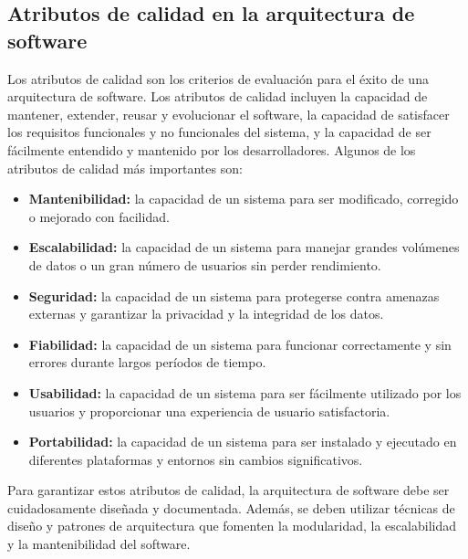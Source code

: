 \documentclass[executivepaper]{article}
\begin{document}
\subsection{Atributos de calidad en la arquitectura de software}

Los atributos de calidad son los criterios de evaluación para el éxito de una arquitectura de software. Los atributos de calidad incluyen la capacidad de mantener, extender, reusar y evolucionar el software, la capacidad de satisfacer los requisitos funcionales y no funcionales del sistema, y la capacidad de ser fácilmente entendido y mantenido por los desarrolladores. Algunos de los atributos de calidad más importantes son:

\begin{itemize}
\item \textbf{Mantenibilidad:} la capacidad de un sistema para ser modificado, corregido o mejorado con facilidad.
\item \textbf{Escalabilidad:} la capacidad de un sistema para manejar grandes volúmenes de datos o un gran número de usuarios sin perder rendimiento.
\item \textbf{Seguridad:} la capacidad de un sistema para protegerse contra amenazas externas y garantizar la privacidad y la integridad de los datos.
\item \textbf{Fiabilidad:} la capacidad de un sistema para funcionar correctamente y sin errores durante largos períodos de tiempo.
\item \textbf{Usabilidad:} la capacidad de un sistema para ser fácilmente utilizado por los usuarios y proporcionar una experiencia de usuario satisfactoria.
\item \textbf{Portabilidad:} la capacidad de un sistema para ser instalado y ejecutado en diferentes plataformas y entornos sin cambios significativos.
\end{itemize}

Para garantizar estos atributos de calidad, la arquitectura de software debe ser cuidadosamente diseñada y documentada. Además, se deben utilizar técnicas de diseño y patrones de arquitectura que fomenten la modularidad, la escalabilidad y la mantenibilidad del software.
\end{document}
